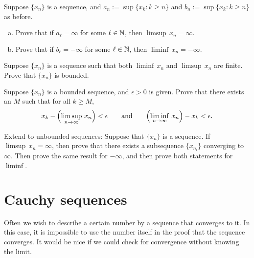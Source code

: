 \begin{exercise}
Suppose $\{ x_n \}$ is a sequence,
and $a_n := \sup \{ x_k : k \geq n \}$ and
$b_n := \sup \{ x_k : k \geq n \}$ as before.
\begin{enumerate}[a)]
\item
Prove that if $a_\ell = \infty$ for some $\ell \in {\mathbb{N}}$, then 
$\limsup\, x_n = \infty$.
\item
Prove that if $b_\ell = -\infty$ for some $\ell \in {\mathbb{N}}$, then 
$\liminf\, x_n = -\infty$.
\end{enumerate}
\end{exercise}

\begin{exercise}
Suppose $\{ x_n \}$ is a sequence
such that both $\liminf\, x_n$ and
$\limsup\, x_n$  are finite.  Prove that $\{ x_n \}$ is bounded.
\end{exercise}

\begin{exercise}
Suppose $\{ x_n \}$ is a bounded sequence, and $\epsilon > 0$ is given.
Prove that there exists an $M$ such that for all $k \geq M$,
\begin{equation*}
x_k - \Bigl(\limsup_{n\to\infty}\, x_n\Bigr) < \epsilon \qquad \text{and} \qquad
\Bigl(\liminf_{n\to\infty}\, x_n\Bigr) - x_k < \epsilon .
\end{equation*}
\end{exercise}

\begin{exercise} \label{exercise:extendsubseqlimsupinf}
Extend  to unbounded sequences:  Suppose that $\{
x_n \}$ is a sequence.  If $\limsup\, x_n = \infty$, then prove that
there exists a subsequence $\{ x_{n_i} \}$ converging to $\infty$.
Then prove the same result for $-\infty$, and then prove both statements for
$\liminf$.
\end{exercise}



\sectionnewpage
\section{Cauchy sequences}
\label{sec:cauchy}


Often we wish to describe a certain number 
by a sequence that converges to it.  In this case, it is impossible to use the
number itself in the proof that the sequence converges.
It would be nice if we could check for convergence without knowing
the limit.

